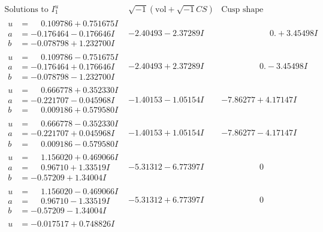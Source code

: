 \documentclass[1p]{elsarticle_modified}
\theoremstyle{definition}
\newcommand{\I}{\sqrt{-1}}
\begin{document}
$$\begin{array}{c|c|c}
\text{Solutions to }I^u_{1}& \I (\text{vol} + \sqrt{-1}CS) & \text{Cusp shape}\\
 \hline 
\begin{aligned}
u &= \phantom{-}0.109786 + 0.751675 I \\
a &= -0.176464 - 0.176646 I \\
b &= -0.078798 + 1.232700 I\end{aligned}
 & -2.40493 - 2.37289 I & \phantom{-0.000000 -}0. + 3.45498 I \\ \hline\begin{aligned}
u &= \phantom{-}0.109786 - 0.751675 I \\
a &= -0.176464 + 0.176646 I \\
b &= -0.078798 - 1.232700 I\end{aligned}
 & -2.40493 + 2.37289 I & \phantom{-0.000000 } 0. - 3.45498 I \\ \hline\begin{aligned}
u &= \phantom{-}0.666778 + 0.352330 I \\
a &= -0.221707 - 0.045968 I \\
b &= \phantom{-}0.009186 + 0.579580 I\end{aligned}
 & -1.40153 - 1.05154 I & -7.86277 + 4.17147 I \\ \hline\begin{aligned}
u &= \phantom{-}0.666778 - 0.352330 I \\
a &= -0.221707 + 0.045968 I \\
b &= \phantom{-}0.009186 - 0.579580 I\end{aligned}
 & -1.40153 + 1.05154 I & -7.86277 - 4.17147 I \\ \hline\begin{aligned}
u &= \phantom{-}1.156020 + 0.469066 I \\
a &= \phantom{-}0.96710 + 1.33519 I \\
b &= -0.57209 + 1.34004 I\end{aligned}
 & -5.31312 - 6.77397 I & \phantom{-0.000000 } 0 \\ \hline\begin{aligned}
u &= \phantom{-}1.156020 - 0.469066 I \\
a &= \phantom{-}0.96710 - 1.33519 I \\
b &= -0.57209 - 1.34004 I\end{aligned}
 & -5.31312 + 6.77397 I & \phantom{-0.000000 } 0 \\ \hline\begin{aligned}
u &= -0.017517 + 0.748826 I \\

\end{aligned}
\end{array}$$
\end{document}
